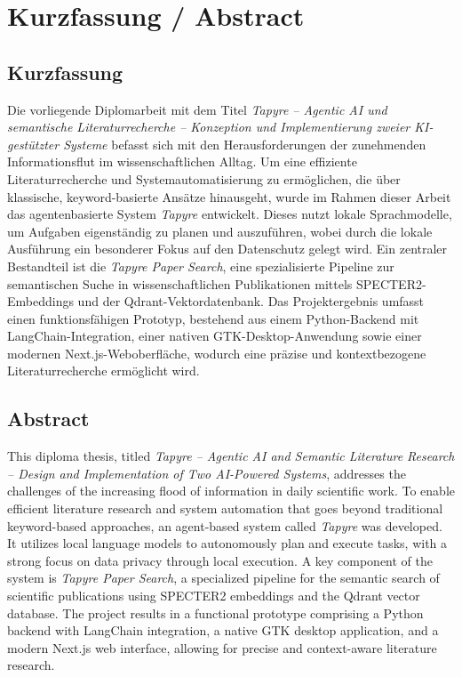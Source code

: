 \chapter*{Kurzfassung / Abstract}
\label{cha:abstract}

\section*{Kurzfassung}

Die vorliegende Diplomarbeit mit dem Titel \textit{Tapyre -- Agentic AI und semantische Literaturrecherche -- Konzeption und Implementierung zweier KI-gestützter Systeme} befasst sich mit den Herausforderungen der zunehmenden Informationsflut im wissenschaftlichen Alltag. Um eine effiziente Literaturrecherche und Systemautomatisierung zu ermöglichen, die über klassische, keyword-basierte Ansätze hinausgeht, wurde im Rahmen dieser Arbeit das agentenbasierte System \textit{Tapyre} entwickelt. Dieses nutzt lokale Sprachmodelle, um Aufgaben eigenständig zu planen und auszuführen, wobei durch die lokale Ausführung ein besonderer Fokus auf den Datenschutz gelegt wird. Ein zentraler Bestandteil ist die \textit{Tapyre Paper Search}, eine spezialisierte Pipeline zur semantischen Suche in wissenschaftlichen Publikationen mittels SPECTER2-Embeddings und der Qdrant-Vektordatenbank. Das Projektergebnis umfasst einen funktionsfähigen Prototyp, bestehend aus einem Python-Backend mit LangChain-Integration, einer nativen GTK-Desktop-Anwendung sowie einer modernen Next.js-Weboberfläche, wodurch eine präzise und kontextbezogene Literaturrecherche ermöglicht wird.

\vspace{1cm}

\section*{Abstract}

This diploma thesis, titled \textit{Tapyre -- Agentic AI and Semantic Literature Research -- Design and Implementation of Two AI-Powered Systems}, addresses the challenges of the increasing flood of information in daily scientific work. To enable efficient literature research and system automation that goes beyond traditional keyword-based approaches, an agent-based system called \textit{Tapyre} was developed. It utilizes local language models to autonomously plan and execute tasks, with a strong focus on data privacy through local execution. A key component of the system is \textit{Tapyre Paper Search}, a specialized pipeline for the semantic search of scientific publications using SPECTER2 embeddings and the Qdrant vector database. The project results in a functional prototype comprising a Python backend with LangChain integration, a native GTK desktop application, and a modern Next.js web interface, allowing for precise and context-aware literature research.
